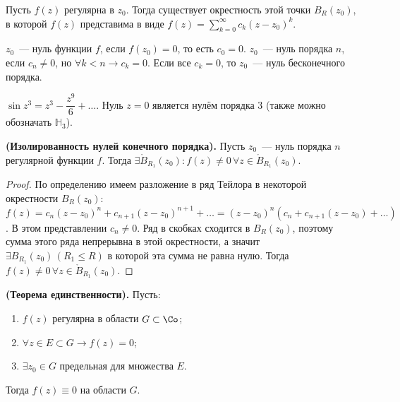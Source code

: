 
Пусть \(f(z)\) регулярна в \(z_0\). Тогда существует окрестность этой точки \(B_R(z_0)\), в которой
\(f(z)\) представима в виде \(f(z) = \sum\limits_{k = 0}^\infty c_k (z-z_0)^k\).

\begin{definition}
    \(z_0\)~--- нуль функции \(f\), если \(f(z_0) = 0\), то есть \(c_0 = 0\). \(z_0\)~--- нуль 
    порядка \(n\), если \(c_n \ne 0\), но \(\forall k < n \rightarrow c_k = 0\). Если все 
    \(c_k = 0\), то \(z_0\)~--- нуль бесконечного порядка.
\end{definition}

\begin{example}
    \(\sin{z^3} = z^3 - \dfrac{z^9}{6} + \dots\). Нуль \(z = 0\) является нулём порядка 3 (также 
    можно обозначать \(\mathbb{H}_3\)).
\end{example}

\begin{statement}\label{20:isolated_zeros}
    \textbf{(Изолированность нулей конечного порядка).} Пусть \(z_0\)~--- нуль порядка \(n\)
    регулярной функции \(f\). Тогда \(\exists \mathring{B}_{R_1}(z_0)\colon f(z) \ne 0 \, \forall z 
    \in \mathring{B}_{R_1}(z_0)\).
\end{statement}

\begin{proof}
    По определению имеем разложение в ряд Тейлора в некоторой окрестности \(B_R(z_0)\): \(f(z) = 
    c_n(z-z_0)^n + c_{n+1}(z-z_0)^{n+1} + \dots = (z-z_0)^n(c_n + c_{n+1} (z-z_0) + \dots)\). В этом
    представлении \(c_n \ne 0\). Ряд в скобках сходится в \(B_R(z_0)\), поэтому сумма этого ряда 
    непрерывна в этой окрестности, а значит \(\exists B_{R_1}(z_0) \, (R_1 \le R)\) в которой эта
    сумма не равна нулю. Тогда \(f(z) \ne 0 \, \forall z \in \mathring{B}_{R_1}(z_0)\).
\end{proof}

\begin{statement}
    \textbf{(Теорема единственности).} Пусть:
    \begin{enumerate}[wide=20pt, label=\arabic*., itemsep=0ex]
        \item \(f(z)\) регулярна в области \(G \subset \Co\);
        \item \(\forall z \in E \subset G \rightarrow f(z) = 0\);
        \item \(\exists z_0 \in G\) предельная для множества \(E\).
    \end{enumerate}
    Тогда \(f(z) \equiv 0\) на области \(G\).
\end{statement}

